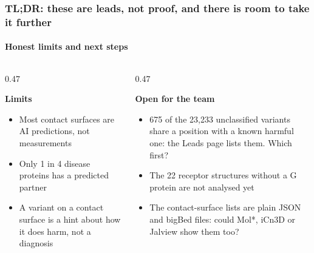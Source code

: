 \documentclass[10pt,aspectratio=169]{beamer}
\newcommand{\points}[1]{\begin{itemize}\setlength{\itemsep}{2.5mm}#1\end{itemize}}
\begin{document}
\begin{frame}
  \frametitle{TL;DR: these are leads, not proof, and there is room to take it further}
  \framesubtitle{Honest limits and next steps}
  \begin{columns}[T,onlytextwidth]
    \begin{column}{0.47\textwidth}
      {\small\bfseries Limits\par}\vspace{1.5mm}
      \points{
        \item Most contact surfaces are AI predictions, not measurements
        \item Only 1 in 4 disease proteins has a predicted partner
        \item A variant on a contact surface is a hint about how it does harm,
          not a diagnosis
      }
    \end{column}
    \begin{column}{0.47\textwidth}
      {\small\bfseries Open for the team\par}\vspace{1.5mm}
      \points{
        \item 675 of the 23,233 unclassified variants share a position with a
          known harmful one: the Leads page lists them. Which first?
        \item The 22 receptor structures without a G protein are not analysed
          yet
        \item The contact-surface lists are plain JSON and bigBed files: could
          Mol*, iCn3D or Jalview show them too?
      }
    \end{column}
  \end{columns}
\end{frame}

\appendix
\end{document}
